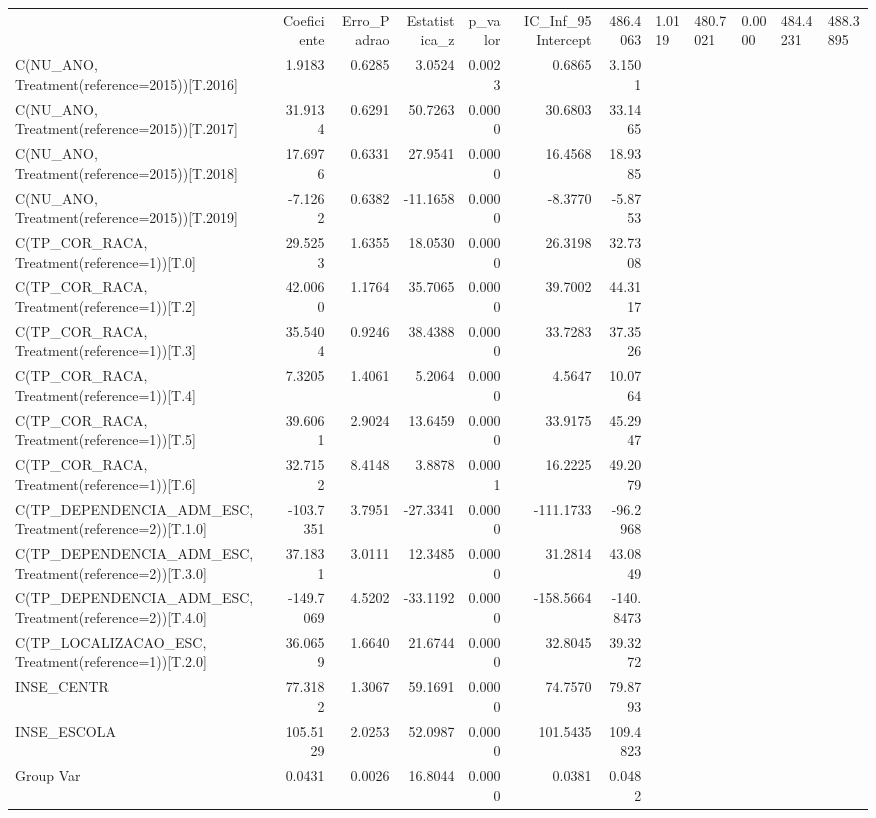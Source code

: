 \begin{tabular}{lrrrrrr}
\toprule
 & Coeficiente & Erro_Padrao & Estatistica_z & p_valor & IC_Inf_95%
\midrule
Intercept & 486.4063 & 1.0119 & 480.7021 & 0.0000 & 484.4231 & 488.3895 \\
C(NU_ANO, Treatment(reference=2015))[T.2016] & 1.9183 & 0.6285 & 3.0524 & 0.0023 & 0.6865 & 3.1501 \\
C(NU_ANO, Treatment(reference=2015))[T.2017] & 31.9134 & 0.6291 & 50.7263 & 0.0000 & 30.6803 & 33.1465 \\
C(NU_ANO, Treatment(reference=2015))[T.2018] & 17.6976 & 0.6331 & 27.9541 & 0.0000 & 16.4568 & 18.9385 \\
C(NU_ANO, Treatment(reference=2015))[T.2019] & -7.1262 & 0.6382 & -11.1658 & 0.0000 & -8.3770 & -5.8753 \\
C(TP_COR_RACA, Treatment(reference=1))[T.0] & 29.5253 & 1.6355 & 18.0530 & 0.0000 & 26.3198 & 32.7308 \\
C(TP_COR_RACA, Treatment(reference=1))[T.2] & 42.0060 & 1.1764 & 35.7065 & 0.0000 & 39.7002 & 44.3117 \\
C(TP_COR_RACA, Treatment(reference=1))[T.3] & 35.5404 & 0.9246 & 38.4388 & 0.0000 & 33.7283 & 37.3526 \\
C(TP_COR_RACA, Treatment(reference=1))[T.4] & 7.3205 & 1.4061 & 5.2064 & 0.0000 & 4.5647 & 10.0764 \\
C(TP_COR_RACA, Treatment(reference=1))[T.5] & 39.6061 & 2.9024 & 13.6459 & 0.0000 & 33.9175 & 45.2947 \\
C(TP_COR_RACA, Treatment(reference=1))[T.6] & 32.7152 & 8.4148 & 3.8878 & 0.0001 & 16.2225 & 49.2079 \\
C(TP_DEPENDENCIA_ADM_ESC, Treatment(reference=2))[T.1.0] & -103.7351 & 3.7951 & -27.3341 & 0.0000 & -111.1733 & -96.2968 \\
C(TP_DEPENDENCIA_ADM_ESC, Treatment(reference=2))[T.3.0] & 37.1831 & 3.0111 & 12.3485 & 0.0000 & 31.2814 & 43.0849 \\
C(TP_DEPENDENCIA_ADM_ESC, Treatment(reference=2))[T.4.0] & -149.7069 & 4.5202 & -33.1192 & 0.0000 & -158.5664 & -140.8473 \\
C(TP_LOCALIZACAO_ESC, Treatment(reference=1))[T.2.0] & 36.0659 & 1.6640 & 21.6744 & 0.0000 & 32.8045 & 39.3272 \\
INSE_CENTR & 77.3182 & 1.3067 & 59.1691 & 0.0000 & 74.7570 & 79.8793 \\
INSE_ESCOLA & 105.5129 & 2.0253 & 52.0987 & 0.0000 & 101.5435 & 109.4823 \\
Group Var & 0.0431 & 0.0026 & 16.8044 & 0.0000 & 0.0381 & 0.0482 \\
\bottomrule
\end{tabular}
